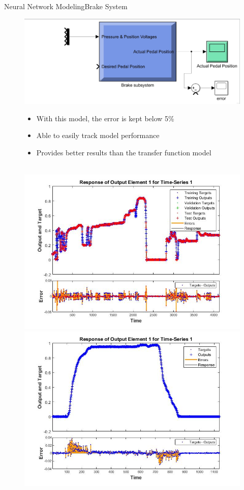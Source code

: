 \documentclass{beamer}
\begin{document}
\begin{frame}{Neural Network Modeling}{Brake System}
	\begin{block}{}
\begin{figure}[H]
  			\centering \includegraphics[width=.48\linewidth , height=.37\textheight]{figs/img/newBrakeSimulinkBlock.jpg}\quad%
			\centering \begin{minipage}[b][0.4\textheight][c]{.45\linewidth}  \begin{itemize}
			\item With this model, the error is kept below 5\%
			\item Able to easily track model performance
			\item Provides better results than the transfer function model
			\end{itemize} \end{minipage}\\[1em]
			\centering \includegraphics[width=.45\linewidth , height=.37\textheight]{figs/img/brake_new_neuralNetworkFig.jpg}\quad%
			\centering \includegraphics[width=.45\linewidth , height=.37\textheight]{figs/img/brake_new_neuralNetworkFigLog2Test.jpg}
  		\end{figure}
	
  \end{block}
\end{frame}
\end{document}
